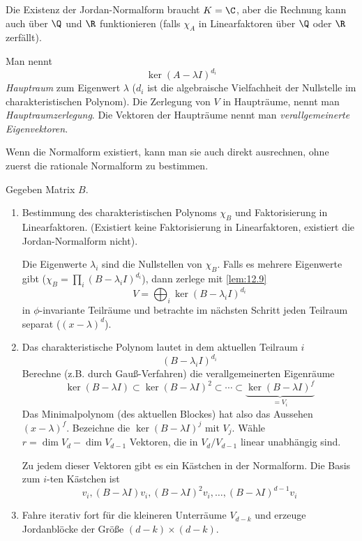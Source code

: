 \documentclass{mycourse}
\begin{document}
\begin{note}
	Die Existenz der Jordan-Normalform braucht $K=\C$, aber die Rechnung kann auch über $\Q$ und $\R$ funktionieren (falls $\chi_A$ in Linearfaktoren über $\Q$ oder $\R$ zerfällt).
\end{note}

\begin{df*}
	Man nennt
	\[
		\ker(A -\lambda I)^{d_i}
	\]
	\emph{Hauptraum} zum Eigenwert $\lambda$ ($d_i$ ist die algebraische Vielfachheit der Nullstelle im charakteristischen Polynom).
	Die Zerlegung von $V$ in Haupträume, nennt man \emph{Hauptraumzerlegung}.
	Die Vektoren der Haupträume nennt man \emph{verallgemeinerte Eigenvektoren}.
\end{df*}

Wenn die Normalform existiert, kann man sie auch direkt ausrechnen, ohne zuerst die rationale Normalform zu bestimmen.

\begin{alg*}
	Gegeben Matrix $B$.
	\begin{enumerate}[{Schritt} 1]
		\item
			Bestimmung des charakteristischen Polynoms $\chi_B$ und Faktorisierung in Linearfaktoren.
			(Existiert keine Faktorisierung in Linearfaktoren, existiert die Jordan-Normalform nicht).

			Die Eigenwerte $\lambda_i$ sind die Nullstellen von $\chi_B$.
			Falls es mehrere Eigenwerte gibt ($\chi_B = \prod_i (B-\lambda_i I)^{d_i}$), dann zerlege mit \ref{lem:12.9}
			\[
				V = \bigoplus_i \ker(B-\lambda_i I)^{d_i}
			\]
			in $\phi$-invariante Teilräume und betrachte im nächsten Schritt jeden Teilraum separat ($(x-\lambda)^d$).
		\item
			Das charakteristische Polynom lautet in dem aktuellen Teilraum $i$
			\[
				(B-\lambda_i I)^{d_i}
			\]
			Berechne (z.B. durch Gauß-Verfahren) die verallgemeinerten Eigenräume
			\[
				\ker(B-\lambda I) \subset \ker(B-\lambda I)^2 \subset \dotsb \subset \underbrace{\ker(B-\lambda I)^f}_{=V_i}
			\]
			Das Minimalpolynom (des aktuellen Blockes) hat also das Aussehen $(x-\lambda)^f$.
			Bezeichne die $\ker(B-\lambda I)^j$ mit $V_j$.
			Wähle $r = \dim V_d - \dim V_{d-1}$ Vektoren, die in $V_d/V_{d-1}$ linear unabhängig sind.
			
			Zu jedem dieser Vektoren gibt es ein Kästchen in der Normalform.
			Die Basis zum $i$-ten Kästchen ist
			\[
				v_i, (B-\lambda I)v_i, (B-\lambda I)^2v_i, \dotsc, (B-\lambda I)^{d-1}v_i
			\]
		\item
			Fahre iterativ fort für die kleineren Unterräume $V_{d-k}$ und erzeuge Jordanblöcke der Größe $(d-k)\times (d-k)$.
	\end{enumerate}
\end{alg*}
\end{document}
